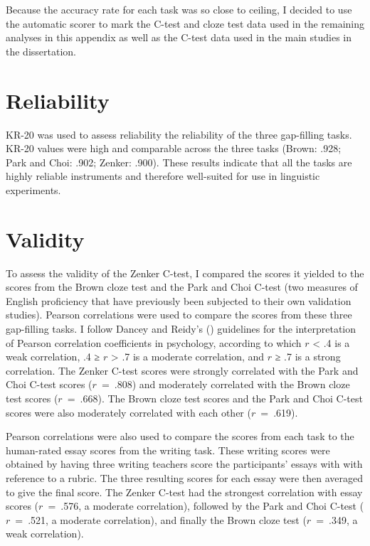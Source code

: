 Because the accuracy rate for each task was so close to ceiling, I decided to use the automatic scorer to mark the C-test and cloze test data used in the remaining analyses in this appendix as well as the C-test data used in the main studies in the dissertation.

\section{Reliability}

KR-20 was used to assess reliability the reliability of the three gap-filling tasks. KR-20 values were high and comparable across the three tasks (Brown: .928; Park and Choi: .902; Zenker: .900). These results indicate that all the tasks are highly reliable instruments and therefore well-suited for use in linguistic experiments.

\section{Validity}

To assess the validity of the Zenker C-test, I compared the scores it yielded to the scores from the Brown cloze test and the Park and Choi C-test (two measures of English proficiency that have previously been subjected to their own validation studies). Pearson correlations were used to compare the scores from these three gap-filling tasks. I follow Dancey and Reidy's (\citeyear{dancey.reidy2007}) guidelines for the interpretation of Pearson correlation coefficients in psychology, according to which $r$ < .4 is a weak correlation, .4 ≥ $r$ > .7 is a moderate correlation, and $r$ ≥ .7 is a strong correlation. The Zenker C-test scores were strongly correlated with the Park and Choi C-test scores ($r$~=~.808) and moderately correlated with the Brown cloze test scores ($r$~=~.668). The Brown cloze test scores and the Park and Choi C-test scores were also moderately correlated with each other ($r$~=~.619).

Pearson correlations were also used to compare the scores from each task to the human-rated essay scores from the writing task. These writing scores were obtained by having three writing teachers score the participants' essays with with reference to a rubric. The three resulting scores for each essay were then averaged to give the final score. The Zenker C-test had the strongest correlation with essay scores ($r$~=~.576, a moderate correlation), followed by the Park and Choi C-test ($r$~=~.521, a moderate correlation), and finally the Brown cloze test ($r$~=~.349, a weak correlation). 

